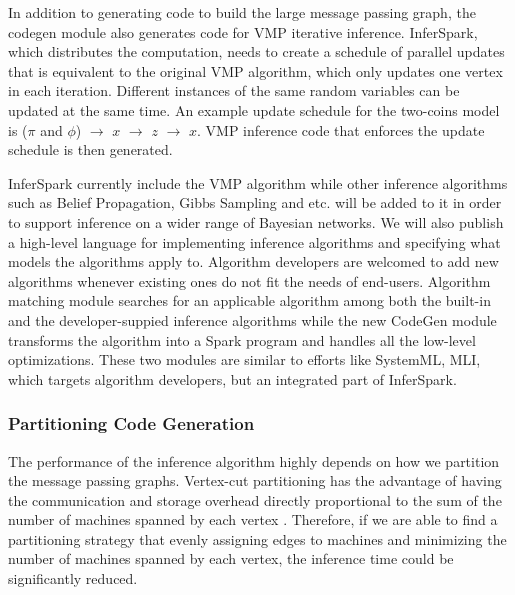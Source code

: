 
In addition to generating code to build the large message passing graph,
the codegen module also generates code for VMP iterative inference.
InferSpark, which
distributes the computation, needs to create a schedule of parallel updates
that is equivalent to the original VMP algorithm, which only updates one vertex
in each iteration.  Different instances of the same random variables can be
updated at the same time. An example update schedule for the two-coins model is
($\pi$ and $\phi$) $\rightarrow$ $x$ $\rightarrow$ $z$ $\rightarrow$ $x$. VMP inference code that enforces the update
schedule is then generated. %

InferSpark currently include the VMP algorithm while other inference algorithms
such as Belief Propagation, Gibbs Sampling and etc. will be added to it in
order to support inference on a wider range of Bayesian networks. We will also
publish a high-level language for implementing inference algorithms and
specifying what models the algorithms apply to.  Algorithm developers are
welcomed to add new algorithms whenever existing ones do not fit the needs of
end-users. Algorithm matching module searches for an applicable algorithm among
both the built-in and the developer-suppied inference algorithms while the new
CodeGen module transforms the algorithm into a Spark program and handles all
the low-level optimizations. These two modules are similar to efforts like
SystemML, MLI, which targets algorithm developers, but an integrated part of
InferSpark.

\subsubsection{Partitioning Code Generation}
The performance of the inference algorithm highly
depends on how we partition the message passing graphs.
Vertex-cut partitioning has the advantage
of having the communication and storage overhead directly proportional to the sum of the number of machines spanned by each vertex \cite{graphX}.
Therefore, if we are able to find a partitioning strategy that evenly assigning edges to machines
and minimizing the number of machines spanned by each vertex,
the inference time could be significantly reduced.

